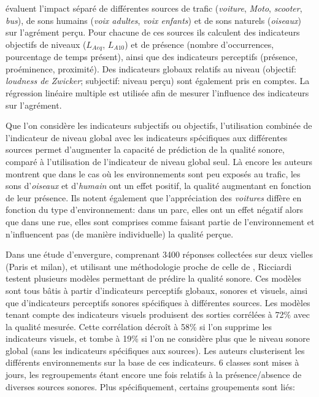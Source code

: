 \citep{defreville2004aactivity,lavandier2006contribution} évaluent l'impact séparé de différentes sources de trafic (\emph{voiture}, \emph{Moto}, \emph{scooter}, \emph{bus}), de sons humains (\emph{voix adultes}, \emph{voix enfants}) et de sons naturels (\emph{oiseaux}) sur l'agrément perçu. Pour chacune de ces sources ils  calculent des indicateurs objectifs de niveaux ($L_{Aeq}$, $L_{A10}$) et de présence (nombre d’occurrences, pourcentage de temps présent), ainsi que des indicateurs perceptifs (présence, proéminence, proximité). Des indicateurs globaux relatifs au niveau (objectif: \emph{loudness de Zwicker}; subjectif: niveau perçu) sont également pris en comptes. La régression linéaire multiple est utilisée afin de mesurer l'influence des indicateurs sur l'agrément.

Que l'on considère les indicateurs subjectifs ou objectifs, l'utilisation combinée de l'indicateur de niveau global avec les indicateurs spécifiques aux différentes sources permet d'augmenter la capacité de prédiction de la qualité sonore, comparé à l'utilisation de l'indicateur de niveau global seul. Là encore les auteurs montrent que dans le cas où les environnements sont peu exposés au trafic, les sons d'\emph{oiseaux} et d'\emph{humain} ont un effet positif, la qualité augmentant en fonction de leur présence. Ils notent également que l'appréciation des \emph{voitures} diffère en fonction du type d'environnement: dans un parc, elles ont un effet négatif alors que dans une rue, elles sont comprises comme faisant partie de l'environnement et n'influencent pas (de manière individuelle) la qualité perçue.

Dans une étude d'envergure, comprenant 3400 réponses collectées sur deux vielles (Paris et milan), et utilisant une méthodologie proche de celle de \citep{lavandier2006contribution}, Ricciardi~\al \citep{ricciardi2015sound} testent plusieurs modèles permettant de prédire la qualité sonore. Ces modèles sont tous bâtis à partir d'indicateurs perceptifs globaux, sonores et visuels, ainsi que d'indicateurs perceptifs sonores spécifiques à différentes sources. Les modèles tenant compte des indicateurs visuels produisent des sorties corrélées à 72\% avec la qualité mesurée. Cette corrélation décroît à 58\% si l'on supprime les indicateurs visuels, et tombe à 19\% si l'on ne considère plus que le niveau sonore global (sans les indicateurs spécifiques aux sources). Les auteurs clusterisent les différents environnements sur la base de ces indicateurs. 6 classes sont mises à jours, les regroupements étant encore une fois relatifs à la présence/absence de diverses sources sonores. Plus spécifiquement, certains groupements sont liés:

